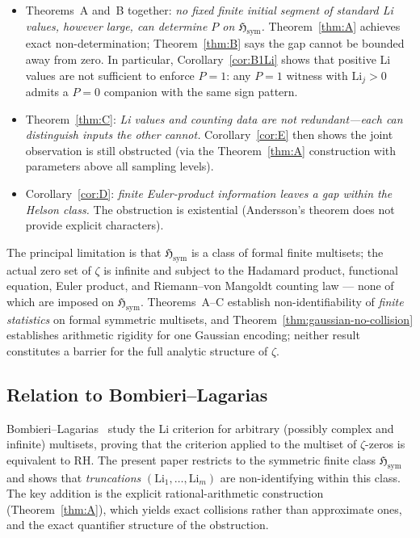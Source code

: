 \documentclass[12pt]{amsart}
\theoremstyle{definition}
\theoremstyle{remark}
\theoremstyle{plain}
\newcommand{\Hsym}{\mathfrak{H}_{\mathrm{sym}}}
\newcommand{\Li}{\mathrm{Li}}
\begin{document}
\begin{itemize}
\item Theorems~A and~B together: \emph{no fixed finite initial segment of
  standard Li values, however large, can determine $P$ on $\Hsym$.}
  Theorem~\ref{thm:A} achieves exact non-determination; Theorem~\ref{thm:B} says the gap
  cannot be bounded away from zero.  In particular, Corollary~\ref{cor:B1Li} shows
  that positive Li values are not sufficient to enforce $P=1$: any $P=1$ witness
  with $\Li_j > 0$ admits a $P=0$ companion with the same sign pattern.

\item Theorem~\ref{thm:C}: \emph{Li values and counting data are not
  redundant---each can distinguish inputs the other cannot.}
  Corollary~\ref{cor:E} then shows the joint observation is still obstructed
  (via the Theorem~\ref{thm:A} construction with parameters above all sampling levels).

\item Corollary~\ref{cor:D}: \emph{finite Euler-product information leaves a gap
  within the Helson class.}  The obstruction is existential (Andersson's
  theorem does not provide explicit characters).
\end{itemize}

The principal limitation is that $\Hsym$ is a class of formal finite
multisets; the actual zero set of $\zeta$ is infinite and subject to
the Hadamard product, functional equation, Euler product, and
Riemann--von Mangoldt counting law --- none of which are imposed on $\Hsym$.
Theorems~A--C establish non-identifiability of \emph{finite statistics}
on formal symmetric multisets, and Theorem~\ref{thm:gaussian-no-collision}
establishes arithmetic rigidity for one Gaussian encoding; neither result
constitutes a barrier for the full analytic structure of $\zeta$.

\subsection{Relation to Bombieri--Lagarias}

Bombieri--Lagarias~\cite{BombieriLagarias1999} study the Li criterion for
arbitrary (possibly complex and infinite) multisets, proving that the
criterion applied to the multiset of $\zeta$-zeros is equivalent to RH.  The present paper restricts to the symmetric finite class $\Hsym$
and shows that \emph{truncations} $(\Li_1,\ldots,\Li_m)$ are
non-identifying within this class.  The key addition is the explicit
rational-arithmetic construction (Theorem~\ref{thm:A}), which yields exact collisions
rather than approximate ones, and the exact quantifier structure of the
obstruction.
\end{document}
